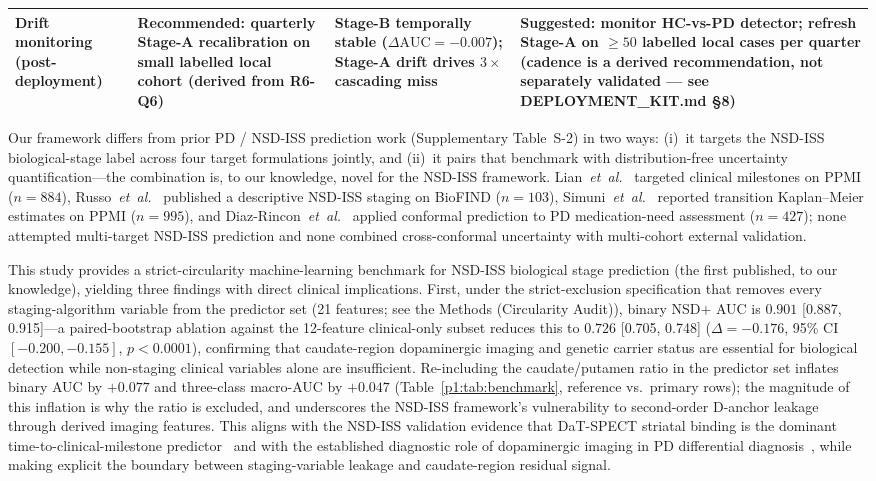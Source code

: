 \documentclass[10pt,letterpaper]{article}
\begin{document}
\begin{table}[!t]
\begin{tabular}{@{}p{2.4cm}p{2.6cm}p{2.0cm}p{2.0cm}@{}}
\midrule
Drift monitoring (post-deployment) & Recommended: quarterly Stage-A recalibration on small labelled local cohort (derived from R6-Q6) & Stage-B temporally stable ($\Delta\mathrm{AUC} = -0.007$); Stage-A drift drives $3{\times}$ cascading miss & Suggested: monitor HC-vs-PD detector; refresh Stage-A on $\geq 50$ labelled local cases per quarter (cadence is a derived recommendation, not separately validated --- see DEPLOYMENT\_KIT.md §8) \\
\bottomrule
\end{tabular}
\end{table}

Our framework differs from prior PD / NSD-ISS prediction work (Supplementary Table~S-2) in two ways: (i)~it targets the NSD-ISS biological-stage label across four target formulations jointly, and (ii)~it pairs that benchmark with distribution-free uncertainty quantification---the combination is, to our knowledge, novel for the NSD-ISS framework. Lian~\textit{et~al.}~\cite{adamedgraph} targeted clinical milestones on PPMI ($n{=}884$), Russo~\textit{et~al.}~\cite{russo2025} published a descriptive NSD-ISS staging on BioFIND ($n{=}103$), Simuni~\textit{et~al.}~\cite{simuni2025} reported transition Kaplan--Meier estimates on PPMI ($n{=}995$), and Diaz-Rincon~\textit{et~al.}~\cite{diazrincon2025} applied conformal prediction to PD medication-need assessment ($n{=}427$); none attempted multi-target NSD-ISS prediction and none combined cross-conformal uncertainty with multi-cohort external validation.

This study provides a strict-circularity machine-learning benchmark for NSD-ISS biological stage prediction (the first published, to our knowledge), yielding three findings with direct clinical implications. First, under the strict-exclusion specification that removes every staging-algorithm variable from the predictor set (21 features; see the Methods (Circularity Audit)), binary NSD$+$ AUC is $0.901$ [0.887, 0.915]---a paired-bootstrap ablation against the 12-feature clinical-only subset reduces this to $0.726$ [0.705, 0.748] ($\Delta{=}-0.176$, 95\% CI $[-0.200, -0.155]$, $p{<}0.0001$), confirming that caudate-region dopaminergic imaging and genetic carrier status are essential for biological detection while non-staging clinical variables alone are insufficient. Re-including the caudate/putamen ratio in the predictor set inflates binary AUC by $+0.077$ and three-class macro-AUC by $+0.047$ (Table~\ref{p1:tab:benchmark}, reference vs.\ primary rows); the magnitude of this inflation is why the ratio is excluded, and underscores the NSD-ISS framework's vulnerability to second-order D-anchor leakage through derived imaging features. This aligns with the NSD-ISS validation evidence that DaT-SPECT striatal binding is the dominant time-to-clinical-milestone predictor~\cite{simuni2024val} and with the established diagnostic role of dopaminergic imaging in PD differential diagnosis~\cite{seibyl2018dat}, while making explicit the boundary between staging-variable leakage and caudate-region residual signal.
\end{document}
